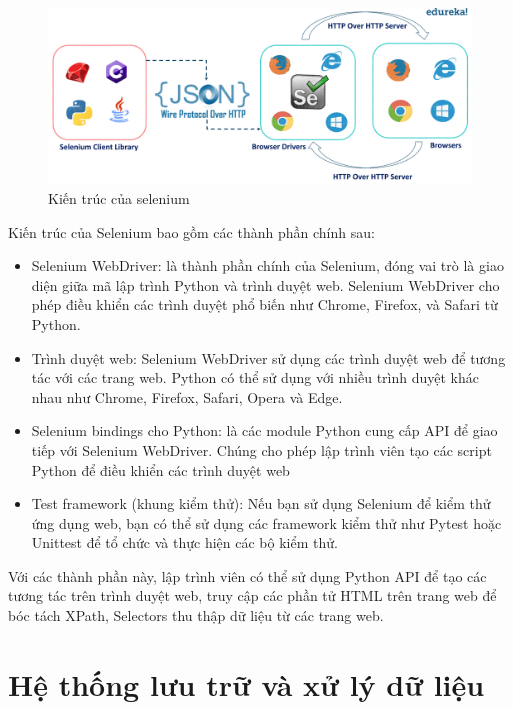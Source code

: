 \documentclass[../DoAn.tex]{subfiles}
\begin{document}
\begin{figure}[H]
    \centering
    \includegraphics[scale=0.19]{Hinhve/selenium_architecture.png}
    \caption{Kiến trúc của selenium}
    \label{fig:my_label2}
\end{figure}

Kiến trúc của Selenium bao gồm các thành phần chính sau:
\begin{itemize}
    \item Selenium WebDriver: là thành phần chính của Selenium, đóng vai trò là giao diện giữa mã lập trình Python và trình duyệt web. Selenium WebDriver cho phép điều khiển các trình duyệt phổ biến như Chrome, Firefox, và Safari từ Python.
    \item Trình duyệt web: Selenium WebDriver sử dụng các trình duyệt web để tương tác với các trang web. Python có thể sử dụng với nhiều trình duyệt khác nhau như Chrome, Firefox, Safari, Opera và Edge.
    \item Selenium bindings cho Python: là các module Python cung cấp API để giao tiếp với Selenium WebDriver. Chúng cho phép lập trình viên tạo các script Python để điều khiển các trình duyệt web
    \item Test framework (khung kiểm thử): Nếu bạn sử dụng Selenium để kiểm thử ứng dụng web, bạn có thể sử dụng các framework kiểm thử như Pytest hoặc Unittest để tổ chức và thực hiện các bộ kiểm thử.
\end{itemize}
Với các thành phần này, lập trình viên có thể sử dụng Python API  để tạo các tương tác trên trình duyệt web, truy cập các phần tử HTML trên trang web để bóc tách XPath, Selectors thu thập dữ liệu từ các trang web.

\section{Hệ thống lưu trữ và xử lý dữ liệu}
\label{section:3.2}
\end{document}
